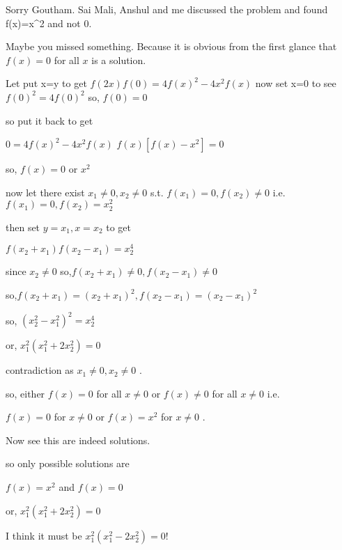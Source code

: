 \begin{solution}
	\begin{tcolorbox}Sorry Goutham.
Sai Mali, Anshul and me discussed the problem and found f(x)=x^2 and not 0.\end{tcolorbox}
Maybe you missed something. Because it is obvious from the first glance that $f(x)=0$ for all $x$ is a solution.
\end{solution}



\begin{solution}
	Let put x=y to get 
$f(2x)f(0)=4f(x)^2-4x^2f(x)$
now set x=0 to see
$f(0)^2=4f(0)^2$
so, $f(0)=0$

so put it back to get

$ 0=4f(x)^2-4x^2f(x)$
$f(x)[f(x)-x^2]=0$

so, $ f(x)=0 $ or $ x^2$

now let there exist $x_{1}\neq 0, x_{2}\neq 0$ s.t. $f(x_{1})=0,f(x_{2})\neq 0$
i.e. $f(x_{1})=0,f(x_{2})=x_{2}^2$

then set $y=x_{1},x=x_{2}$ to get

$f(x_{2}+x_{1})f(x_{2}-x_{1})=x_{2}^4$

since $x_{2}\neq 0$ so,$f(x_{2}+x_{1})\neq 0, f(x_{2}-x_{1})\neq 0$

 so,$f(x_{2}+x_{1})=(x_{2}+x_{1})^2, f(x_{2}-x_{1})=(x_{2}-x_{1})^2$

so, $(x_{2}^2-x_{1}^2)^2=x_{2}^4$

or, $x_{1}^2(x_{1}^2+2x_{2}^2)=0$

contradiction as $x_{1}\neq 0, x_{2}\neq 0$ .

so, either $f(x)=0$ for all $x\neq 0$ or $f(x)\neq0$ for all $x\neq 0$ i.e.

$f(x)=0$ for $x\neq 0$ or $f(x)=x^2$ for $x\neq 0$ .

Now see this are indeed solutions.

so only possible solutions are

$f(x)=x^2$ and $f(x)=0$
\end{solution}



\begin{solution}
	\begin{tcolorbox}
or, $x_{1}^2(x_{1}^2+2x_{2}^2)=0$
\end{tcolorbox}

I think it must be $x_{1}^2(x_{1}^2-2x_{2}^2)=0$!
\end{solution}




